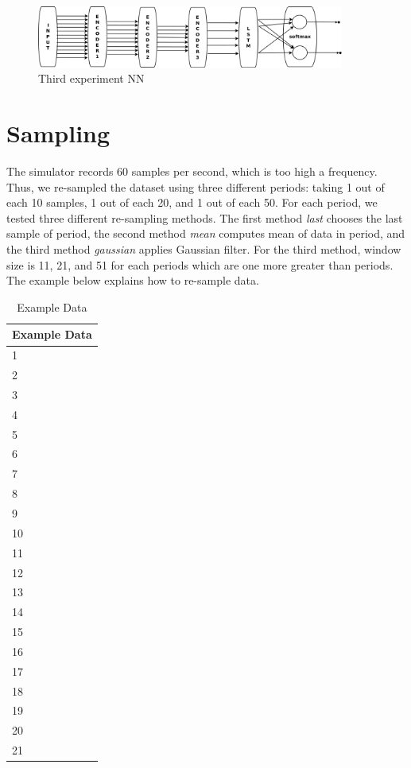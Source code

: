 \documentclass[draft,dvipsnames]{drexel-thesis}
\begin{document}
\begin{thesis}
\begin{figure}[t!]
    \centering
    \includegraphics[width=0.9\textwidth]{pictures/figures/exp_NN3.png}
    \caption{Third experiment NN}
    \label{fig:exp_NN3}
\end{figure}


\section{Sampling}
The simulator records 60 samples per second, which is too high a frequency. Thus, we re-sampled the dataset using three different periods: taking 1 out of each 10 samples, 1 out of each 20, and 1 out of each  50. For each period, we tested three different re-sampling methods. The first method {\em last} chooses the last sample of period, the second method {\em mean} computes mean of data in period, and the third method {\em gaussian} applies Gaussian filter. For the third method, window size is 11, 21, and 51 for each periods which are one more greater than periods. The example below explains how to re-sample data.

\begin{table}[!t]
\centering
\caption{Example Data}
\label{tbl:example_data}
\begin{small}
\begin{tabular}{|l|}
\hline
Example Data \\ \hline
1            \\
2            \\
3            \\
4            \\
5            \\
6            \\
7            \\
8            \\
9            \\
10           \\
11           \\
12           \\
13           \\
14           \\
15           \\
16           \\
17           \\
18           \\
19           \\
20           \\
21           \\ \hline
\end{tabular}
\end{small}
\end{table}


\end{thesis}
\end{document}

